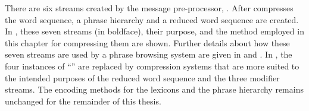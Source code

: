 There are six streams created by the message 
pre-processor, \prepair.  After \repair compresses the
word sequence, a phrase hierarchy and a reduced word
sequence are created.  In ,
these seven streams (in boldface), their purpose,
and the method employed in this chapter for compressing
them are shown.  Further
details about how these seven streams are used by a phrase
browsing system are given
in  and .  In
, the four instances of ``\shuff''
are replaced by compression systems that are more suited
to the intended purposes of the reduced word sequence and the 
three modifier streams.  The encoding methods for the lexicons
and the phrase hierarchy remains unchanged for the remainder
of this thesis.

\newlength{\mytablength}
\setlength{\mytablength}{\textwidth}
\addtolength{\mytablength}{-0.1cm}

